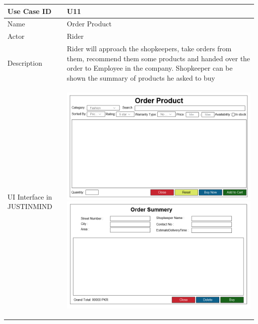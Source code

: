 \documentclass[12pt,a4paper]{report}
\begin{document}
\begin{tabular}{ | m{3cm} | m{12cm}| } \hline

Use Case ID &   U11\\\hline

Name  	    & Order Product  \\ \hline

Actor     	& Rider \\ \hline

Description & Rider will approach the shopkeepers, take orders from them, recommend them some products and handed over the order to Employee in the company. Shopkeeper can be shown the summary of products he asked to buy \\ \hline

UI Interface in JUSTINMIND & \begin{center}
 \includegraphics[scale=0.3]{./UIs for Latex Reports/UI-011 Order Product@1x.png} 
\includegraphics[scale=0.3]{./UIs for Latex Reports/UI-012 Order Summery@1x.png}\end{center}

 \\ \hline


\end{tabular}
\end{document}
